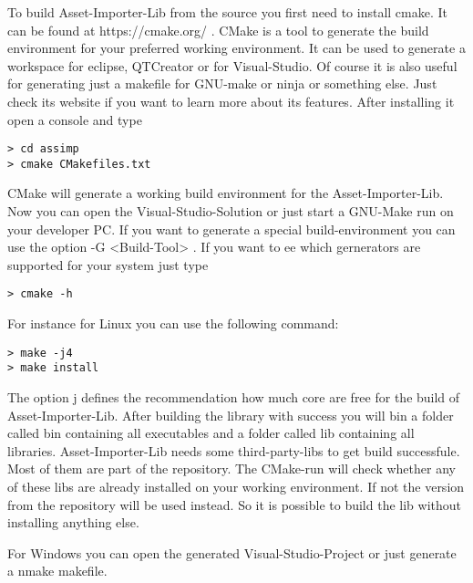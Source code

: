 To build Asset-Importer-Lib from the source you first need to install cmake. It can be found at https://cmake.org/ . CMake is a tool to generate the build environment 
for your preferred working environment. It can be used to generate a workspace for eclipse, QTCreator or for Visual-Studio. Of course it is also useful for generating just 
a makefile for GNU-make or ninja or something else. Just check its website if you want to learn more about its features. After installing it open a console and type
\begin{lstlisting}[label=some-code,caption=Generate the makefile for Linux]
> cd assimp
> cmake CMakefiles.txt
\end{lstlisting}

CMake will generate a working build environment for the Asset-Importer-Lib. Now you can open the Visual-Studio-Solution or just start a GNU-Make run on your developer PC. 
If you want to generate a special build-environment you can use the option -G <Build-Tool> . If you want to ee which gernerators are supported for your system just type 
\begin{lstlisting}[label=some-code,caption=Run the build on Linux using 4 cores]
> cmake -h
\end{lstlisting}

For instance for Linux you can use the following command:
\begin{lstlisting}[label=some-code,caption=Run the build on Linux using 4 cores]
> make -j4
> make install
\end{lstlisting}

The option j defines the recommendation how much core are free for the build of Asset-Importer-Lib.
After building the library with success you will bin a folder called bin containing all executables and a folder called lib containing all libraries. Asset-Importer-Lib needs
some third-party-libs to get build successfule. Most of them are part of the repository. The CMake-run will check whether any of these libs are already installed on your working 
environment. If not the version from the repository will be used instead. So it is possible to build the lib without installing anything else.
\par
For Windows you can open the generated Visual-Studio-Project or just generate a nmake makefile.
